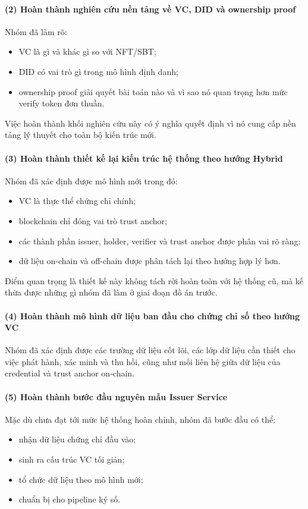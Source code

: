 \paragraph{(2) Hoàn thành nghiên cứu nền tảng về VC, DID và ownership proof}
Nhóm đã làm rõ:
\begin{itemize}
    \item VC là gì và khác gì so với NFT/SBT;
    \item DID có vai trò gì trong mô hình định danh;
    \item ownership proof giải quyết bài toán nào và vì sao nó quan trọng hơn mức verify token đơn thuần.
\end{itemize}

Việc hoàn thành khối nghiên cứu này có ý nghĩa quyết định vì nó cung cấp nền tảng lý thuyết cho toàn bộ kiến trúc mới.

\paragraph{(3) Hoàn thành thiết kế lại kiến trúc hệ thống theo hướng Hybrid}
Nhóm đã xác định được mô hình mới trong đó:
\begin{itemize}
    \item VC là thực thể chứng chỉ chính;
    \item blockchain chỉ đóng vai trò trust anchor;
    \item các thành phần issuer, holder, verifier và trust anchor được phân vai rõ ràng;
    \item dữ liệu on-chain và off-chain được phân tách lại theo hướng hợp lý hơn.
\end{itemize}

Điểm quan trọng là thiết kế này không tách rời hoàn toàn với hệ thống cũ, mà kế thừa được những gì nhóm đã làm ở giai đoạn đồ án trước.

\paragraph{(4) Hoàn thành mô hình dữ liệu ban đầu cho chứng chỉ số theo hướng VC}
Nhóm đã xác định được các trường dữ liệu cốt lõi, các lớp dữ liệu cần thiết cho việc phát hành, xác minh và thu hồi, cũng như mối liên hệ giữa dữ liệu của credential và trust anchor on-chain.

\paragraph{(5) Hoàn thành bước đầu nguyên mẫu Issuer Service}
Mặc dù chưa đạt tới mức hệ thống hoàn chỉnh, nhóm đã bước đầu có thể:
\begin{itemize}
    \item nhận dữ liệu chứng chỉ đầu vào;
    \item sinh ra cấu trúc VC tối giản;
    \item tổ chức dữ liệu theo mô hình mới;
    \item chuẩn bị cho pipeline ký số.
\end{itemize}


